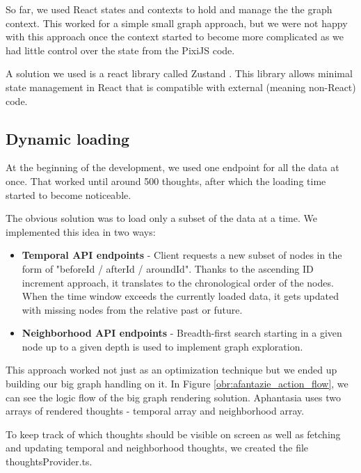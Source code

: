 So far, we used React states and contexts to hold and manage the the graph context.
This worked for a simple small graph approach, but we were not happy with this approach once the context started to become more complicated
as we had little control over the state from the PixiJS code.

A solution we used is a react library called Zustand \cite{zustand_homepage}.
This library allows minimal state management in React that is compatible with external (meaning non-React) code.

\subsection*{Dynamic loading}
At the beginning of the development, we used one endpoint for all the data at once.
That worked until around 500 thoughts, after which the loading time started to become noticeable. 

The obvious solution was to load only a subset of the data at a time. We implemented this idea in two ways:
\begin{itemize}
    \item \textbf{Temporal API endpoints} - Client requests a new subset of nodes in the form of "beforeId / afterId / aroundId".
 Thanks to the ascending ID increment approach, it translates to the chronological order of the nodes.
 When the time window exceeds the currently loaded data, it gets updated with missing nodes from the relative past or future.
    \item \textbf{Neighborhood API endpoints} - Breadth-first search starting in a given node up to a given depth is used to implement graph exploration.
\end{itemize}

This approach worked not just as an optimization technique but we ended up building our big graph handling on it.
In Figure \ref{obr:afantazie_action_flow}, we can see the logic flow of the big graph rendering solution.
Aphantasia uses two arrays of rendered thoughts - temporal array and neighborhood array.

To keep track of which thoughts should be visible on screen as well as fetching and updating temporal and neighborhood thoughts,
we created the file thoughtsProvider.ts.

